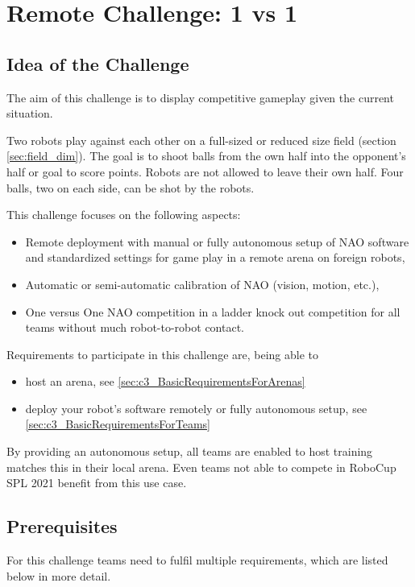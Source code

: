 \section{Remote Challenge: 1 vs 1}
\label{sec:OneVsOneChallenge}

\subsection{Idea of the Challenge}
The aim of this challenge is to display competitive gameplay given the current situation.

Two robots play against each other on a full-sized or reduced size field (\cf section \ref{sec:field_dim}). The goal is to shoot balls from the own half into the opponent's half or goal to score points. Robots are not allowed to leave their own half. Four balls, two on each side, can be shot by the robots.

This challenge focuses on the following aspects:
\begin{itemize}
    \item Remote deployment with manual or fully autonomous setup of NAO software and standardized settings for game play in a remote arena on foreign robots,
    \item Automatic or semi-automatic calibration of NAO (vision, motion, etc.), 
    \item One versus One NAO competition in a ladder knock out competition for all teams without much robot-to-robot contact. 
\end{itemize}

Requirements to participate in this challenge are, being able to
\begin{itemize}
	\item host an arena, see \ref{sec:c3_BasicRequirementsForArenas}
	\item deploy your robot's software remotely or fully autonomous setup, see \ref{sec:c3_BasicRequirementsForTeams}
\end{itemize}

By providing an autonomous setup, all teams are enabled to host training matches this in their local arena. Even teams not able to compete in RoboCup SPL 2021 benefit from this use case.

\subsection{Prerequisites}
\label{sec:c3_Prerequisites}
For this challenge teams need to fulfil multiple requirements, which are listed below in more detail.

